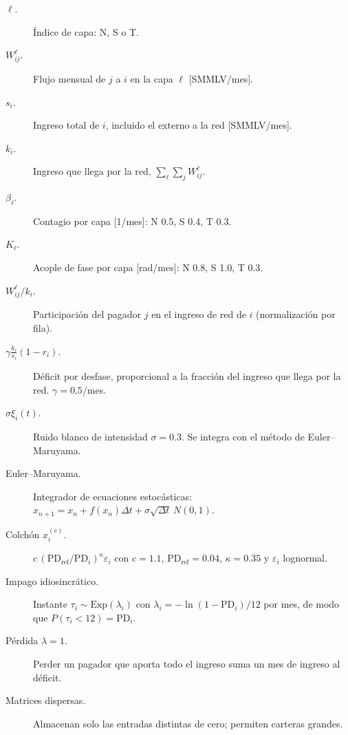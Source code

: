 \begin{terminos}
\begin{description}
\item[$\ell$.] Índice de capa: N, S o T.
\item[$W^\ell_{ij}$.] Flujo mensual de $j$ a $i$ en la capa $\ell$ [SMMLV/mes].
\item[$s_i$.] Ingreso total de $i$, incluido el externo a la red [SMMLV/mes].
\item[$k_i$.] Ingreso que llega por la red, $\sum_\ell\sum_jW^\ell_{ij}$.
\item[$\beta_\ell$.] Contagio por capa [1/mes]: N 0.5, S 0.4, T 0.3.
\item[$K_\ell$.] Acople de fase por capa [rad/mes]: N 0.8, S 1.0, T 0.3.
\item[$W^\ell_{ij}/k_i$.] Participación del pagador $j$ en el ingreso de red de $i$
(normalización por fila).
\item[$\gamma\frac{k_i}{s_i}(1-r_i)$.] Déficit por desfase, proporcional a la fracción del
ingreso que llega por la red. $\gamma=0.5$/mes.
\item[$\sigma\xi_i(t)$.] Ruido blanco de intensidad $\sigma=0.3$. Se integra con el
método de Euler–Maruyama.
\item[Euler–Maruyama.] Integrador de ecuaciones estocásticas:
$x_{n+1}=x_n+f(x_n)\Delta t+\sigma\sqrt{\Delta t}\,N(0,1)$.
\item[Colchón $x_i^{(c)}$.] $c\,(\mathrm{PD}_\text{ref}/\mathrm{PD}_i)^\kappa\varepsilon_i$
con $c=1.1$, $\mathrm{PD}_\text{ref}=0.04$, $\kappa=0.35$ y $\varepsilon_i$ lognormal.
\item[Impago idiosincrático.] Instante $\tau_i\sim\mathrm{Exp}(\lambda_i)$ con
$\lambda_i=-\ln(1-\mathrm{PD}_i)/12$ por mes, de modo que $P(\tau_i<12)=\mathrm{PD}_i$.
\item[Pérdida $\lambda=1$.] Perder un pagador que aporta todo el ingreso suma un mes de
ingreso al déficit.
\item[Matrices dispersas.] Almacenan solo las entradas distintas de cero; permiten
carteras grandes.
\end{description}
\end{terminos}
\begin{preguntas}
\end{preguntas}

